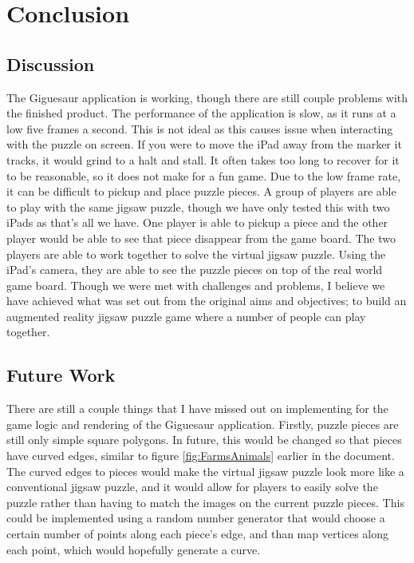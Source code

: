 \documentclass{article}
\begin{document}

\section{Conclusion}

\subsection{Discussion}
The Giguesaur application is working, though there are still couple problems
with the finished product. The performance of the application is slow, as it
runs at a low five frames a second. This is not ideal as this causes issue when
interacting with the puzzle on screen. If you were to move the iPad away from
the marker it tracks, it would grind to a halt and stall. It often takes too
long to recover for it to be reasonable, so it does not make for a fun game. Due
to the low frame rate, it can be difficult to pickup and place puzzle pieces. A
group of players are able to play with the same jigsaw puzzle, though we have
only tested this with two iPads as that's all we have. One player is able to
pickup a piece and the other player would be able to see that piece disappear
from the game board. The two players are able to work together to solve the
virtual jigsaw puzzle. Using the iPad's camera, they are able to see the puzzle
pieces on top of the real world game board. Though we were met with challenges
and problems, I believe we have achieved what was set out from the original aims
and objectives; to build an augmented reality jigsaw puzzle game where a number
of people can play together. 

\subsection{Future Work}
There are still a couple things that I have missed out on implementing for the
game logic and rendering of the Giguesaur application. Firstly, puzzle pieces
are still only simple square polygons. In future, this would be changed so that
pieces have curved edges, similar to figure \ref{fig:FarmsAnimals} earlier in
the document. The curved edges to pieces would make the virtual jigsaw puzzle
look more like a conventional jigsaw puzzle, and it would allow for players to
easily solve the puzzle rather than having to match the images on the current
puzzle pieces. This could be implemented using a random number generator that
would choose a certain number of points along each piece's edge, and than map
vertices along each point, which would hopefully generate a curve.\\
\end{document}
